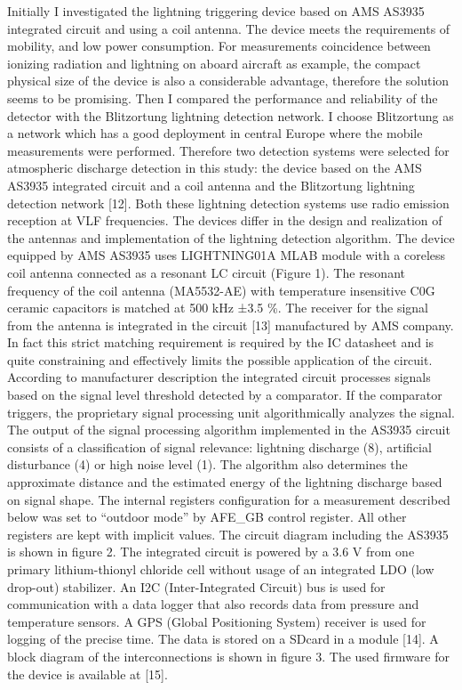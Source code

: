 Initially I investigated the lightning triggering device based on AMS AS3935 integrated circuit and using a coil antenna. The device meets the requirements of mobility, and low power consumption. For measurements coincidence between ionizing radiation and lightning on aboard aircraft as example, the compact physical size of the device is also a considerable advantage, therefore the solution seems to be promising.
Then I compared the performance and reliability of the detector with the Blitzortung lightning detection network. I choose Blitzortung as a network which has a good deployment in central Europe where the mobile measurements were performed.
Therefore two detection systems were selected for atmospheric discharge detection in this study: the device based on the AMS AS3935 integrated circuit and a coil antenna and the Blitzortung lightning detection network [12]. Both these lightning detection systems use radio emission reception at VLF frequencies. The devices differ in the design and realization of the antennas and implementation of the lightning detection algorithm.
The device equipped by AMS AS3935 uses LIGHTNING01A  MLAB module with a coreless coil antenna connected as a resonant LC circuit (Figure 1).  The resonant frequency of the coil antenna (MA5532-AE) with temperature insensitive C0G ceramic capacitors is matched at 500 kHz ±3.5 \%. The receiver for the signal from the antenna is integrated in the circuit [13] manufactured by AMS company. In fact this strict matching requirement is required by the IC datasheet and is quite constraining and effectively limits the possible application of the circuit.
According to manufacturer description the integrated circuit processes signals based on the signal level threshold detected by a comparator. If the comparator triggers, the proprietary signal processing unit algorithmically analyzes the signal. The output of the signal processing algorithm implemented in the AS3935 circuit consists of a classification of signal relevance: lightning discharge (8), artificial disturbance (4) or high noise level (1). The algorithm also determines the approximate distance and the estimated energy of the lightning discharge based on signal shape.
The internal registers configuration for a measurement described below was set to “outdoor mode” by AFE_GB control register. All other registers are kept with implicit values.
The circuit diagram including the AS3935 is shown in figure 2. The integrated circuit is powered by a 3.6 V from one primary lithium-thionyl chloride cell without usage of an integrated LDO (low drop-out) stabilizer. An I2C (Inter-Integrated Circuit) bus is used for communication with a data logger that also records data from pressure and temperature sensors. A GPS (Global Positioning System) receiver is used for logging of the precise time. The data is stored on a SDcard in a module [14].
A block diagram of the interconnections is shown in figure 3. The used firmware for the device is available at [15].

